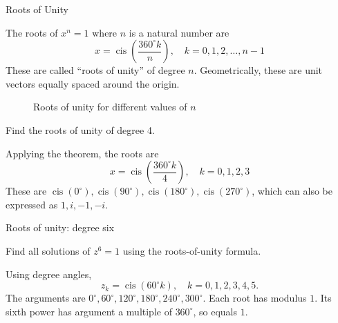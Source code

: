 \begin{frame}{Roots of Unity}
\begin{thm}{}{}
The roots of $x^n=1$ where $n$ is a natural number are
\begin{equation}
x = \operatorname{cis}\!\left(\frac{360^\circ k}{n}\right), \quad k=0,1,2,\ldots,n-1
\end{equation}
These are called ``roots of unity'' of degree $n$. Geometrically, these are unit vectors equally spaced around the origin.
\end{thm}
\end{frame}

\begin{frame}[t]
\begin{figure}[h!]
\centering
{}
\caption{Roots of unity for different values of $n$}
\end{figure}
\end{frame}

\begin{frame}[t]
\begin{ex}
Find the roots of unity of degree 4.
\end{ex}
\begin{sol}
Applying the theorem, the roots are
\[x = \operatorname{cis}\!\left(\frac{360^\circ k}{4}\right), \quad k=0,1,2,3\]
These are $\operatorname{cis}\!\left(0^\circ\right), \operatorname{cis}\!\left(90^\circ\right), \operatorname{cis}\!\left(180^\circ\right), \operatorname{cis}\!\left(270^\circ\right)$, which can also be expressed as $1, i, -1, -i$.
\end{sol}
\end{frame}
\begin{frame}[t]{Roots of unity: degree six}
\small
\begin{ex}
Find all solutions of $z^6=1$ using the roots-of-unity formula.
\end{ex}
\begin{sol}
Using degree angles,\[z_k=\operatorname{cis}\!\left(60^\circ k\right),\quad k=0,1,2,3,4,5.\] The arguments are $0^\circ,60^\circ,120^\circ,180^\circ,240^\circ,300^\circ$. Each root has modulus $1$. Its sixth power has argument a multiple of $360^\circ$, so equals $1$.
\end{sol}
\end{frame}



